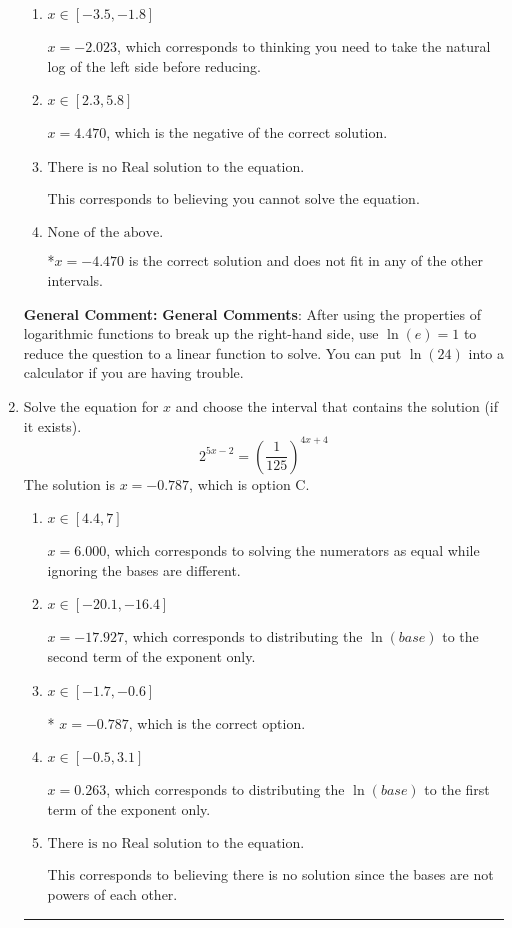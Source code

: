 \documentclass{extbook}[14pt]
\newcommand{\litem}[1]{\item #1

\rule{\textwidth}{0.4pt}}
\begin{document}
\begin{enumerate}
{\begin{enumerate}[label=\Alph*.]
$x = -1.470$, which corresponds to treating any root as a square root.
\item \( x \in [-3.5, -1.8] \)

$x = -2.023$, which corresponds to thinking you need to take the natural log of the left side before reducing.
\item \( x \in [2.3, 5.8] \)

$x = 4.470$, which is the negative of the correct solution.
\item \( \text{There is no Real solution to the equation.} \)

This corresponds to believing you cannot solve the equation.
\item \( \text{None of the above.} \)

*$x = -4.470$ is the correct solution and does not fit in any of the other intervals.
\end{enumerate}

\textbf{General Comment:} \textbf{General Comments}: After using the properties of logarithmic functions to break up the right-hand side, use $\ln(e) = 1$ to reduce the question to a linear function to solve. You can put $\ln(24)$ into a calculator if you are having trouble.
}
\litem{
Solve the equation for $x$ and choose the interval that contains the solution (if it exists).
\[ 2^{5x-2} = \left(\frac{1}{125}\right)^{4x+4} \]
The solution is \( x = -0.787 \), which is option C.\begin{enumerate}[label=\Alph*.]
\item \( x \in [4.4, 7] \)

$x = 6.000$, which corresponds to solving the numerators as equal while ignoring the bases are different.
\item \( x \in [-20.1, -16.4] \)

$x = -17.927$, which corresponds to distributing the $\ln(base)$ to the second term of the exponent only.
\item \( x \in [-1.7, -0.6] \)

* $x = -0.787$, which is the correct option.
\item \( x \in [-0.5, 3.1] \)

$x = 0.263$, which corresponds to distributing the $\ln(base)$ to the first term of the exponent only.
\item \( \text{There is no Real solution to the equation.} \)

This corresponds to believing there is no solution since the bases are not powers of each other.
\end{enumerate}

}
\end{enumerate}
\end{document}
